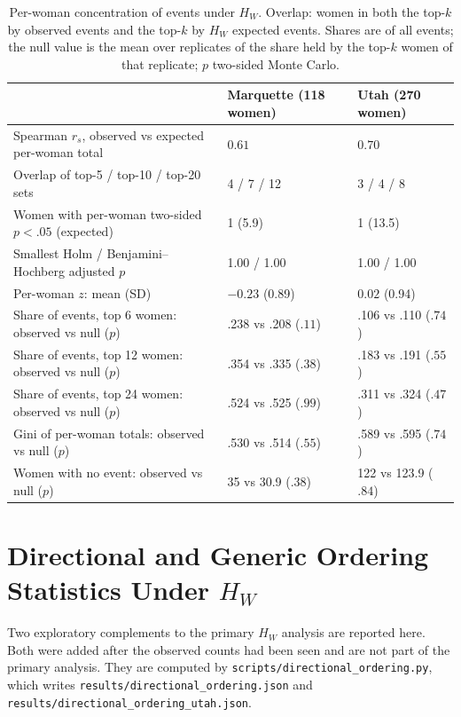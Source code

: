 \documentclass[12pt]{article}
\newcommand{\HW}{H_{W}}
\begin{document}
\begin{table}[!htbp]
\centering
\caption{Per-woman concentration of events under $\HW$. Overlap: women in both the top-$k$
  by observed events and the top-$k$ by $\HW$ expected events. Shares are of all events;
  the null value is the mean over replicates of the share held by the top-$k$ women of that
  replicate; $p$ two-sided Monte Carlo.}
\label{tab:si-conc}
\smallskip
\small
\begin{tabular}{L{6.6cm} C{3.6cm} C{3.6cm}}
\toprule
 & \textbf{Marquette} (118 women) & \textbf{Utah} (270 women) \\
\midrule
Spearman $r_s$, observed vs expected per-woman total & $0.61$ & $0.70$ \\
Overlap of top-5 / top-10 / top-20 sets & 4 / 7 / 12 & 3 / 4 / 8 \\
Women with per-woman two-sided $p < .05$ (expected) & 1 (5.9) & 1 (13.5) \\
Smallest Holm / Benjamini--Hochberg adjusted $p$ & 1.00 / 1.00 & 1.00 / 1.00 \\
Per-woman $z$: mean (SD) & $-0.23$ (0.89) & $0.02$ (0.94) \\
Share of events, top 6 women: observed vs null ($p$) & .238 vs .208 ($.11$) & .106 vs .110 ($.74$) \\
Share of events, top 12 women: observed vs null ($p$) & .354 vs .335 ($.38$) & .183 vs .191 ($.55$) \\
Share of events, top 24 women: observed vs null ($p$) & .524 vs .525 ($.99$) & .311 vs .324 ($.47$) \\
Gini of per-woman totals: observed vs null ($p$) & .530 vs .514 ($.55$) & .589 vs .595 ($.74$) \\
Women with no event: observed vs null ($p$) & 35 vs 30.9 ($.38$) & 122 vs 123.9 ($.84$) \\
\bottomrule
\end{tabular}
\end{table}

\section{Directional and Generic Ordering Statistics Under \texorpdfstring{$\HW$}{HW}}
\label{sec:si-directional}

Two exploratory complements to the primary $\HW$ analysis are reported here. Both were
added after the observed counts had been seen and are not part of the primary analysis.
They are computed by \nolinkurl{scripts/directional_ordering.py}, which writes
\nolinkurl{results/directional_ordering.json} and
\nolinkurl{results/directional_ordering_utah.json}.
\end{document}
